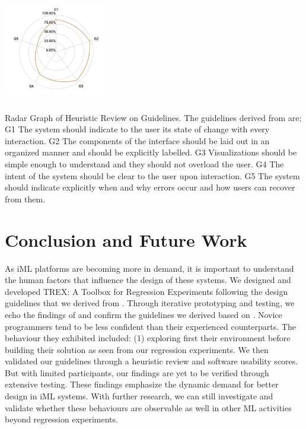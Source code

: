 \documentclass{sigchi-ext}
\begin{document}
\begin{marginfigure}[-20.5pc]
\begin{minipage}{\marginparwidth}
     \centering
    \includegraphics[width=4.5cm,height=4.5cm]{figures/guidelinereview.png}
    \caption{Radar Graph of Heuristic Review on Guidelines. The guidelines derived from \protect \cite{nodalo2019building} are:
    \newline G1 \textemdash The system should indicate to the user its state of change with every interaction.
    \newline G2 \textemdash The components of the interface should be laid out in an organized manner and should be explicitly labelled.
    \newline G3 \textemdash Visualizations should be simple enough to understand and they should not overload the user.
    \newline G4 \textemdash The intent of the system should be clear to the user upon interaction.
    \newline G5 \textemdash The system should indicate explicitly when and why errors occur and how users can recover from them.}
    \label{fig:guidelines}
    \end{minipage}
\end{marginfigure}

\section{Conclusion and Future Work}
As iML platforms are becoming more in demand, it is important to understand the human factors that influence the design of these systems. We designed and developed TREX: A Toolbox for Regression Experiments following the design guidelines that we derived from \cite{nodalo2019building}. Through iterative prototyping and testing, we echo the findings of \cite{sarkar2015interactive} and confirm the guidelines we derived based on \cite{amershi2011designing}. Novice programmers tend to be less confident than their experienced counterparts. The behaviour they exhibited included: (1) exploring first their environment before building their solution as seen from our regression experiments. We then validated our guidelines through a heuristic review and software usability scores. But with limited participants, our findings are yet to be verified through extensive testing. These findings emphasize the dynamic demand for better design in iML systems. With further research, we can still investigate and validate whether these behaviours are observable as well in other ML activities beyond regression experiments. 
\end{document}
